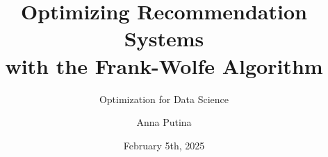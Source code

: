 
\title[FW Recommendation Systems]{Optimizing Recommendation Systems \\
with the Frank-Wolfe Algorithm}
\subtitle{Optimization for Data Science}
\author[Anna Putina]{Anna Putina}


\date[February 5th, 2025] 
{February 5th, 2025}




